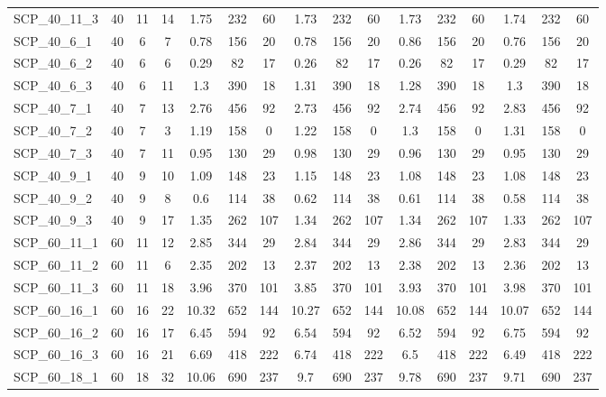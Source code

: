 \begin{sidewaystable}[!ht]
{\begin{tabular}{lccccccccccccccc}
SCP\_40\_11\_3 & 40 & 11 & 14 & 1.75 & 232 & 60 & 1.73 & 232 & 60 & 1.73 & 232 & 60 & 1.74 & 232 & 60 \\
SCP\_40\_6\_1 & 40 & 6 & 7 & 0.78 & 156 & 20 & 0.78 & 156 & 20 & 0.86 & 156 & 20 &  \textcolor{blue2}{0.76} & 156 & 20 \\
SCP\_40\_6\_2 & 40 & 6 & 6 & 0.29 & 82 & 17 &  \textcolor{blue2}{0.26} & 82 & 17 &  \textcolor{blue2}{0.26} & 82 & 17 & 0.29 & 82 & 17 \\
SCP\_40\_6\_3 & 40 & 6 & 11 & 1.3 & 390 & 18 & 1.31 & 390 & 18 &  \textcolor{blue2}{1.28} & 390 & 18 & 1.3 & 390 & 18 \\
SCP\_40\_7\_1 & 40 & 7 & 13 & 2.76 & 456 & 92 &  \textcolor{blue2}{2.73} & 456 & 92 & 2.74 & 456 & 92 & 2.83 & 456 & 92 \\
SCP\_40\_7\_2 & 40 & 7 & 3 & 1.19 & 158 & 0 & 1.22 & 158 & 0 & 1.3 & 158 & 0 & 1.31 & 158 & 0 \\
SCP\_40\_7\_3 & 40 & 7 & 11 & 0.95 & 130 & 29 & 0.98 & 130 & 29 & 0.96 & 130 & 29 & 0.95 & 130 & 29 \\
SCP\_40\_9\_1 & 40 & 9 & 10 & 1.09 & 148 & 23 & 1.15 & 148 & 23 &  \textcolor{blue2}{1.08} & 148 & 23 &  \textcolor{blue2}{1.08} & 148 & 23 \\
SCP\_40\_9\_2 & 40 & 9 & 8 & 0.6 & 114 & 38 & 0.62 & 114 & 38 & 0.61 & 114 & 38 &  \textcolor{blue2}{0.58} & 114 & 38 \\
SCP\_40\_9\_3 & 40 & 9 & 17 & 1.35 & 262 & 107 & 1.34 & 262 & 107 & 1.34 & 262 & 107 &  \textcolor{blue2}{1.33} & 262 & 107 \\
SCP\_60\_11\_1 & 60 & 11 & 12 & 2.85 & 344 & 29 & 2.84 & 344 & 29 & 2.86 & 344 & 29 &  \textcolor{blue2}{2.83} & 344 & 29 \\
SCP\_60\_11\_2 & 60 & 11 & 6 & 2.35 & 202 & 13 & 2.37 & 202 & 13 & 2.38 & 202 & 13 & 2.36 & 202 & 13 \\
SCP\_60\_11\_3 & 60 & 11 & 18 & 3.96 & 370 & 101 &  \textcolor{blue2}{3.85} & 370 & 101 & 3.93 & 370 & 101 & 3.98 & 370 & 101 \\
SCP\_60\_16\_1 & 60 & 16 & 22 & 10.32 & 652 & 144 & 10.27 & 652 & 144 & 10.08 & 652 & 144 &  \textcolor{blue2}{10.07} & 652 & 144 \\
SCP\_60\_16\_2 & 60 & 16 & 17 &  \textcolor{blue2}{6.45} & 594 & 92 & 6.54 & 594 & 92 & 6.52 & 594 & 92 & 6.75 & 594 & 92 \\
SCP\_60\_16\_3 & 60 & 16 & 21 & 6.69 & 418 & 222 & 6.74 & 418 & 222 & 6.5 & 418 & 222 &  \textcolor{blue2}{6.49} & 418 & 222 \\
SCP\_60\_18\_1 & 60 & 18 & 32 & 10.06 & 690 & 237 &  \textcolor{blue2}{9.7} & 690 & 237 & 9.78 & 690 & 237 & 9.71 & 690 & 237 \\

\end{tabular}}
\end{sidewaystable}

